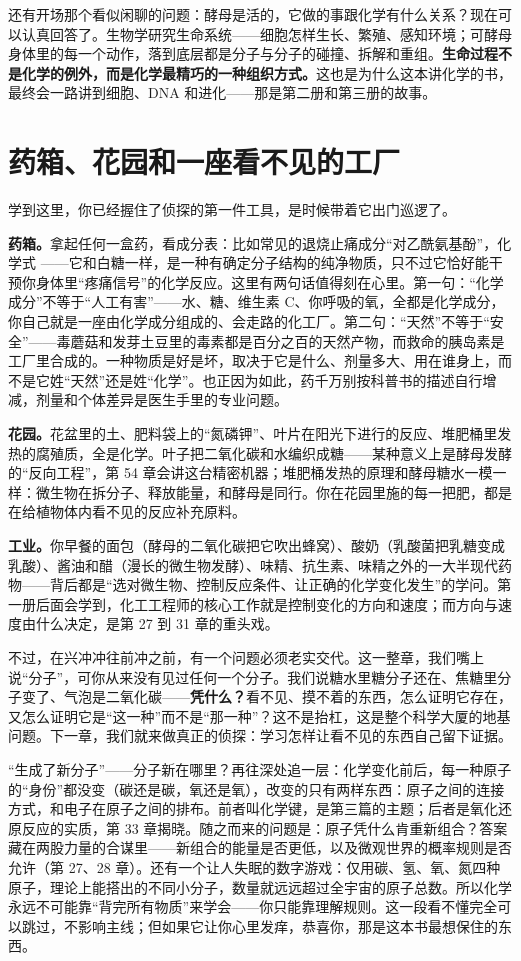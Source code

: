 还有开场那个看似闲聊的问题：酵母是活的，它做的事跟化学有什么关系？现在可以认真回答了。生物学研究生命系统——细胞怎样生长、繁殖、感知环境；可酵母身体里的每一个动作，落到底层都是分子与分子的碰撞、拆解和重组。\textbf{生命过程不是化学的例外，而是化学最精巧的一种组织方式。}这也是为什么这本讲化学的书，最终会一路讲到细胞、DNA 和进化——那是第二册和第三册的故事。

\section{药箱、花园和一座看不见的工厂}

学到这里，你已经握住了侦探的第一件工具，是时候带着它出门巡逻了。

\textbf{药箱。}拿起任何一盒药，看成分表：比如常见的退烧止痛成分“对乙酰氨基酚”，化学式 ——它和白糖一样，是一种有确定分子结构的纯净物质，只不过它恰好能干预你身体里“疼痛信号”的化学反应。这里有两句话值得刻在心里。第一句：“化学成分”不等于“人工有害”——水、糖、维生素 C、你呼吸的氧，全都是化学成分，你自己就是一座由化学成分组成的、会走路的化工厂。第二句：“天然”不等于“安全”——毒蘑菇和发芽土豆里的毒素都是百分之百的天然产物，而救命的胰岛素是工厂里合成的。一种物质是好是坏，取决于它是什么、剂量多大、用在谁身上，而不是它姓“天然”还是姓“化学”。也正因为如此，药千万别按科普书的描述自行增减，剂量和个体差异是医生手里的专业问题。

\textbf{花园。}花盆里的土、肥料袋上的“氮磷钾”、叶片在阳光下进行的反应、堆肥桶里发热的腐殖质，全是化学。叶子把二氧化碳和水编织成糖——某种意义上是酵母发酵的“反向工程”，第 54 章会讲这台精密机器；堆肥桶发热的原理和酵母糖水一模一样：微生物在拆分子、释放能量，和酵母是同行。你在花园里施的每一把肥，都是在给植物体内看不见的反应补充原料。

\textbf{工业。}你早餐的面包（酵母的二氧化碳把它吹出蜂窝）、酸奶（乳酸菌把乳糖变成乳酸）、酱油和醋（漫长的微生物发酵）、味精、抗生素、味精之外的一大半现代药物——背后都是“选对微生物、控制反应条件、让正确的化学变化发生”的学问。第一册后面会学到，化工工程师的核心工作就是控制变化的方向和速度；而方向与速度由什么决定，是第 27 到 31 章的重头戏。

不过，在兴冲冲往前冲之前，有一个问题必须老实交代。这一整章，我们嘴上说“分子”，可你从来没有见过任何一个分子。我们说糖水里糖分子还在、焦糖里分子变了、气泡是二氧化碳——\textbf{凭什么？}看不见、摸不着的东西，怎么证明它存在，又怎么证明它是“这一种”而不是“那一种”？这不是抬杠，这是整个科学大厦的地基问题。下一章，我们就来做真正的侦探：学习怎样让看不见的东西自己留下证据。

\begin{tiaozhan}
“生成了新分子”——分子新在哪里？再往深处追一层：化学变化前后，每一种原子的“身份”都没变（碳还是碳，氧还是氧），改变的只有两样东西：原子之间的连接方式，和电子在原子之间的排布。前者叫化学键，是第三篇的主题；后者是氧化还原反应的实质，第 33 章揭晓。随之而来的问题是：原子凭什么肯重新组合？答案藏在两股力量的合谋里——新组合的能量是否更低，以及微观世界的概率规则是否允许（第 27、28 章）。还有一个让人失眠的数字游戏：仅用碳、氢、氧、氮四种原子，理论上能搭出的不同小分子，数量就远远超过全宇宙的原子总数。所以化学永远不可能靠“背完所有物质”来学会——你只能靠理解规则。这一段看不懂完全可以跳过，不影响主线；但如果它让你心里发痒，恭喜你，那是这本书最想保住的东西。
\end{tiaozhan}

